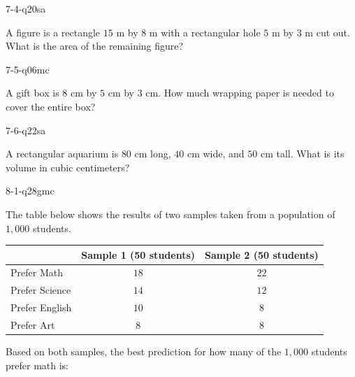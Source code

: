 \begin{practiceQuestion}{7-4-q20}{sa}
\begin{questionText}
A figure is a rectangle $15$ m by $8$ m with a rectangular hole $5$ m by $3$ m cut out. What is the area of the remaining figure?
\end{questionText}
\end{practiceQuestion}

\begin{practiceQuestion}{7-5-q06}{mc}
\begin{questionText}
A gift box is $8$ cm by $5$ cm by $3$ cm. How much wrapping paper is needed to cover the entire box?
\end{questionText}
\end{practiceQuestion}

\begin{practiceQuestion}{7-6-q22}{sa}
\begin{questionText}
A rectangular aquarium is $80$ cm long, $40$ cm wide, and $50$ cm tall. What is its volume in cubic centimeters?
\end{questionText}
\end{practiceQuestion}

\begin{practiceQuestion}{8-1-q28}{gmc}
\begin{questionText}
The table below shows the results of two samples taken from a population of $1{,}000$ students.

\begin{center}
\begin{tabular}{|l|c|c|}
\hline
 & \textbf{Sample 1 (50 students)} & \textbf{Sample 2 (50 students)} \\
\hline
Prefer Math & $18$ & $22$ \\
\hline
Prefer Science & $14$ & $12$ \\
\hline
Prefer English & $10$ & $8$ \\
\hline
Prefer Art & $8$ & $8$ \\
\hline
\end{tabular}
\end{center}

Based on both samples, the best prediction for how many of the $1{,}000$ students prefer math is:
\end{questionText}
\end{practiceQuestion}

